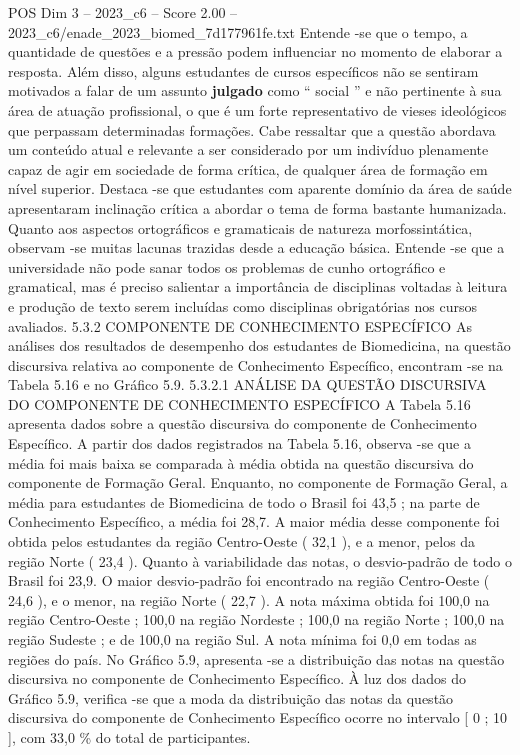 \begin{textsample}{POS Dim 3 – 2023\_c6 – Score 2.00 – 2023\_c6/enade\_2023\_biomed\_7d177961fe.txt}
Entende -se que o tempo, a quantidade de questões e a pressão podem influenciar no momento de elaborar a resposta.
Além disso, alguns estudantes de cursos específicos não se sentiram motivados a falar de um assunto \textbf{julgado} como “ social ” e não pertinente à sua área de atuação profissional, o que é um forte representativo de vieses ideológicos que perpassam determinadas formações.
Cabe ressaltar que a questão abordava um conteúdo atual e relevante a ser considerado por um indivíduo plenamente capaz de agir em sociedade de forma crítica, de qualquer área de formação em nível superior.
Destaca -se que estudantes com aparente domínio da área de saúde apresentaram inclinação crítica a abordar o tema de forma bastante humanizada.
Quanto aos aspectos ortográficos e gramaticais de natureza morfossintática, observam -se muitas lacunas trazidas desde a educação básica.
Entende -se que a universidade não pode sanar todos os problemas de cunho ortográfico e gramatical, mas é preciso salientar a importância de disciplinas voltadas à leitura e produção de texto serem incluídas como disciplinas obrigatórias nos cursos avaliados. 5.3.2 COMPONENTE DE CONHECIMENTO ESPECÍFICO As análises dos resultados de desempenho dos estudantes de Biomedicina, na questão discursiva relativa ao componente de Conhecimento Específico, encontram -se na Tabela 5.16 e no Gráfico 5.9. 5.3.2.1 ANÁLISE DA QUESTÃO DISCURSIVA DO COMPONENTE DE CONHECIMENTO ESPECÍFICO A Tabela 5.16 apresenta dados sobre a questão discursiva do componente de Conhecimento Específico.
A partir dos dados registrados na Tabela 5.16, observa -se que a média foi mais baixa se comparada à média obtida na questão discursiva do componente de Formação Geral.
Enquanto, no componente de Formação Geral, a média para estudantes de Biomedicina de todo o Brasil foi 43,5 ; na parte de Conhecimento Específico, a média foi 28,7.
A maior média desse componente foi obtida pelos estudantes da região Centro-Oeste ( 32,1 ), e a menor, pelos da região Norte ( 23,4 ).
Quanto à variabilidade das notas, o desvio-padrão de todo o Brasil foi 23,9.
O maior desvio-padrão foi encontrado na região Centro-Oeste ( 24,6 ), e o menor, na região Norte ( 22,7 ).
A nota máxima obtida foi 100,0 na região Centro-Oeste ; 100,0 na região Nordeste ; 100,0 na região Norte ; 100,0 na região Sudeste ; e de 100,0 na região Sul.
A nota mínima foi 0,0 em todas as regiões do país.
No Gráfico 5.9, apresenta -se a distribuição das notas na questão discursiva no componente de Conhecimento Específico.
À luz dos dados do Gráfico 5.9, verifica -se que a moda da distribuição das notas da questão discursiva do componente de Conhecimento Específico ocorre no intervalo [ 0 ; 10 ], com 33,0 \% do total de participantes.

\end{textsample}
